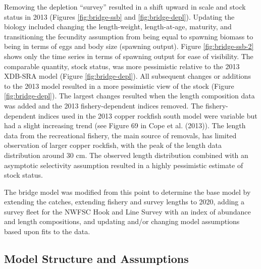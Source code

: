 \documentclass[11pt,
  english,
  a4paper,
]{article}
\begin{document}

Removing the depletion ``survey'' resulted in a shift upward in scale and stock status in 2013 (Figures \ref{fig:bridge-ssb} and \ref{fig:bridge-depl}). Updating the biology included changing the length-weight, length-at-age, maturity, and transitioning the fecundity assumption from being equal to spawning biomass to being in terms of eggs and body size (spawning output). Figure \ref{fig:bridge-ssb-2} shows only the time series in terms of spawning output for ease of visibility. The comparable quantity, stock status, was more pessimistic relative to the 2013 XDB-SRA model (Figure \ref{fig:bridge-depl}). All subsequent changes or additions to the 2013 model resulted in a more pessimistic view of the stock (Figure \ref{fig:bridge-depl}). The largest changes resulted when the length composition data was added and the 2013 fishery-dependent indices removed. The fishery-dependent indices used in the 2013 copper rockfish south model were variable but had a slight increasing trend (see Figure 69 in Cope et al. {(2013)\leavevmode\tagmcend\tagstructend}). The length data from the recreational fishery, the main source of removals, has limited observation of larger copper rockfish, with the peak of the length data distribution around 30 cm. The observed length distribution combined with an asymptotic selectivity assumption resulted in a highly pessimistic estimate of stock status.

\leavevmode\tagmcend\tagstructend\par


The bridge model was modified from this point to determine the base model by extending the catches, extending fishery and survey lengths to 2020, adding a survey fleet for the NWFSC Hook and Line Survey with an index of abundance and length compositions, and updating and/or changing model assumptions based upon fits to the data.

\leavevmode\tagmcend\tagstructend\par


\hypertarget{model-structure-and-assumptions}{%
\subsection{Model Structure and Assumptions}\label{model-structure-and-assumptions}}
\end{document}
